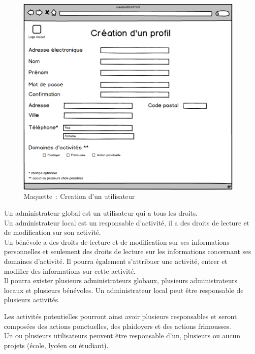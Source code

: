 \begin{figure}[H]
	\centering
	\includegraphics[scale=0.4]{images/creationDUnProfil.png}
	 \caption{Maquette~: Creation d'un utilisateur}
	 \label{creationDUnUtilisateurs}
\end{figure}

Un administrateur global est un utilisateur qui a tous les droits. \\ Un administrateur local est un responsable d'activité, il a des droits de lecture et de modification sur son activité. \\ Un bénévole a des droits de lecture et de modification sur ses informations personnelles et seulement des droits de lecture sur les informations concernant ses domaines d'activité. Il pourra également s'attribuer une activité, entrer et modifier des informations sur cette activité.\\
Il pourra exister plusieurs administrateurs globaux, plusieurs administrateurs locaux et plusieurs bénévoles. Un administrateur local peut être responsable de plusieurs activités.



Les activités potentielles pourront ainsi avoir plusieurs responsables et seront composées des actions ponctuelles, des plaidoyers et des actions frimousses. \\

Un ou plusieurs utilisateurs peuvent être responsable d'un, plusieurs ou aucun projets (école, lycéen ou étudiant).\\

